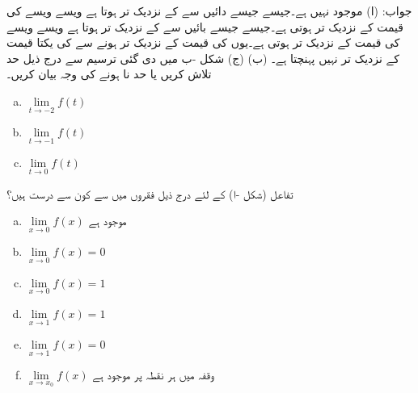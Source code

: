 جواب: (ا) موجود نہیں ہے۔جیسے جیسے  دائیں سے  کے نزدیک تر ہوتا  ہے ویسے ویسے  کی قیمت  کے نزدیک تر ہوتی ہے۔جیسے جیسے  بائیں سے  کے نزدیک تر ہوتا ہے  ویسے ویسے  کی قیمت  کے نزدیک تر ہوتی ہے۔یوں  کی قیمت  کے نزدیک تر ہونے سے  کی یکتا قیمت کے نزدیک تر  نہیں پہنچتا ہے۔ (ب)  (ج)  
شکل -ب میں دی گئی ترسیم سے درج ذیل حد تلاش کریں یا حد نا ہونے کی وجہ بیان کریں۔
\begin{multicols}{3}
\begin{enumerate}[a.]
\item
$\lim\limits_{t\to -2}f(t)$
\item
$\lim\limits_{t\to -1}f(t)$
\item
$\lim\limits_{t\to 0}f(t)$
\end{enumerate}
\end{multicols}
تفاعل   (شکل -ا) کے لئے درج ذیل فقروں میں سے کون سے درست ہیں؟
\begin{multicols}{3}
\begin{enumerate}[a.]
\item
$\lim\limits_{x\to 0}f(x)$ موجود ہے\\
\item
$\lim\limits_{x\to 0}f(x)=0$
\item
$\lim\limits_{x\to 0}f(x)=1$
\item
$\lim\limits_{x\to 1}f(x)=1$
\item
$\lim\limits_{x\to 1}f(x)=0$
\item
$\lim\limits_{x\to x_ 0}f(x)$
وقفہ  میں ہر نقطہ  پر موجود ہے
\end{enumerate}
\end{multicols}
%
